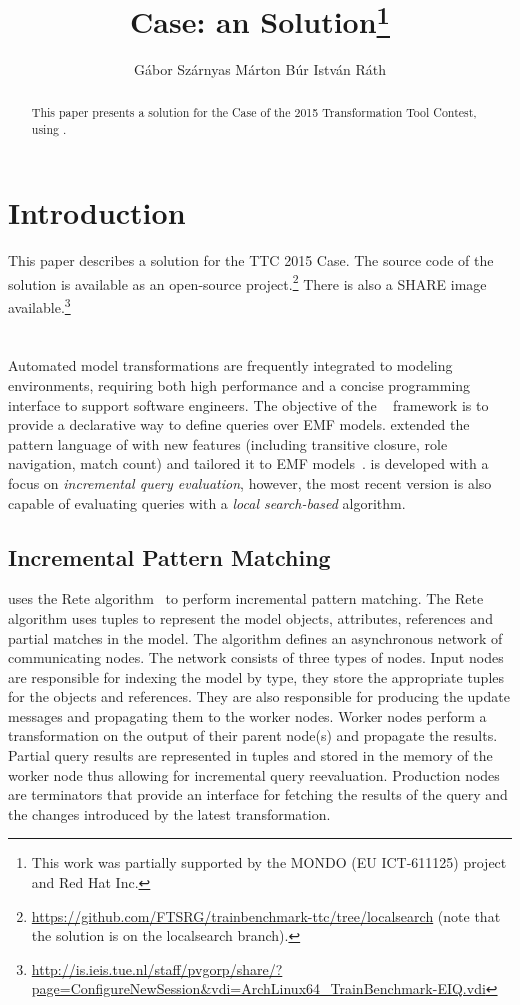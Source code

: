 \documentclass[submission,copyright,creativecommons]{eptcs}
\title{\tb Case: an \eiq Solution\thanks{This work was partially supported by the MONDO (EU ICT-611125) project and Red Hat Inc.}}
\author{G\'{a}bor Sz\'{a}rnyas \qquad M\'{a}rton B\'{u}r \qquad Istv\'{a}n R\'{a}th
\institute{Budapest University of Technology and Economics\\
Department of Measurement and Information Systems\\
H-1117 Magyar tud\'{o}sok krt. 2, Budapest, Hungary}
\email{szarnyas@mit.bme.hu, marton.bur@inf.mit.bme.hu, rath@mit.bme.hu}
}
\begin{document}
\maketitle

\begin{abstract}
This paper presents a solution for the \tb Case of the 2015 Transformation Tool Contest, using \eiq.
\end{abstract}

\section{Introduction}

This paper describes a solution for the TTC 2015 \tb Case. The source code of the solution is available as an open-source project.\footnote{\url{https://github.com/FTSRG/trainbenchmark-ttc/tree/localsearch} (note that the solution is on the \textsf{localsearch} branch).} There is also a SHARE image available.\footnote{\url{http://is.ieis.tue.nl/staff/pvgorp/share/?page=ConfigureNewSession&vdi=ArchLinux64_TrainBenchmark-EIQ.vdi}}

\section{\eiq}

Automated model transformations are frequently integrated to modeling environments, requiring both high performance and a concise programming interface to support software engineers. The objective of the \eiq~\cite{models2010, eiq-homepage} framework is to provide a declarative way to define queries over EMF models. \eiq extended the pattern language of \viatratwo with new features (including transitive closure, role navigation, match count) and tailored it to EMF models~\cite{iqpl}. \eiq is developed with a focus on \emph{incremental query evaluation}, however, the most recent version is also capable of evaluating queries with a \emph{local search-based} algorithm.

\subsection{Incremental Pattern Matching}

\eiq uses the Rete algorithm~\cite{BergmannPhD} to perform incremental pattern matching. The Rete algorithm uses tuples to represent the model objects, attributes, references and partial matches in the model. The algorithm defines an asynchronous network of communicating nodes. The network consists of three types of nodes. Input nodes are responsible for indexing the model by type, \ie they store the appropriate tuples for the objects and references. They are also responsible for producing the update messages and propagating them to the worker nodes. Worker nodes perform a transformation on the output of their parent node(s) and propagate the results. Partial query results are represented in tuples and stored in the memory of the worker node thus allowing for incremental query reevaluation. Production nodes are terminators that provide an interface for fetching the results of the query and the changes introduced by the latest transformation.
\end{document}
